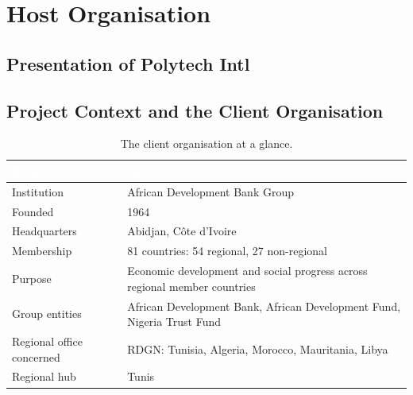 \section{Host Organisation}


\subsection{Presentation of Polytech Intl}


\subsection{Project Context and the Client Organisation}


\begin{table}[h]
\centering
\caption{The client organisation at a glance.}
\label{tab:afdb}
\begin{tabular}{|p{}|p{}|}
\hline
\rowcolor{myblue}\textcolor{white}{\textbf{Item}} & \textcolor{white}{\textbf{Detail}} \\
\hline
Institution & African Development Bank Group \\ \hline
Founded & 1964 \\ \hline
Headquarters & Abidjan, C\^ote d'Ivoire \\ \hline
Membership & 81 countries: 54 regional, 27 non-regional \\ \hline
Purpose & Economic development and social progress across regional member countries \\ \hline
Group entities & African Development Bank, African Development Fund, Nigeria Trust Fund \\ \hline
Regional office concerned & RDGN: Tunisia, Algeria, Morocco, Mauritania, Libya \\ \hline
Regional hub & Tunis \\ \hline
\end{tabular}
\end{table}


